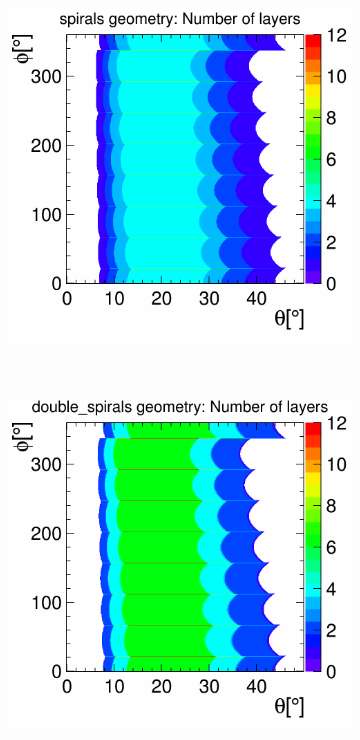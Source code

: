 \begin{figure}[H]
        \begin{subfigure}[b]{0.5\textwidth}
          \centering
          \includegraphics[width=\textwidth]{Figures/Geometries/spirals.png}
          \caption{}
          \label{}
        \end{subfigure}%
        ~ 
        \begin{subfigure}[b]{0.5\textwidth}
          \centering
          \includegraphics[width=\textwidth]{Figures/Geometries/double_spirals.png}

\end{subfigure}
\end{figure}
